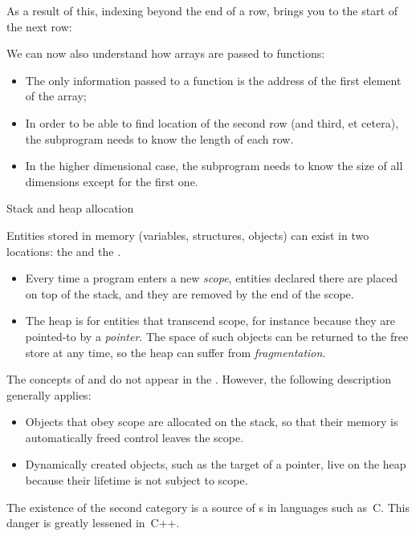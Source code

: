 As a result of this, indexing beyond the end of a row, brings you to the
start of the next row:
%

We can now also understand how arrays are passed to functions:
\begin{itemize}
\item The only information passed to a function is the address of the
  first element of the array;
\item In order to be able to find location of the second row (and
  third, et cetera), the subprogram needs to know the length of each
  row.
\item In the higher dimensional case, the subprogram needs to know the
  size of all dimensions except for the first one.
\end{itemize}

 {Stack and heap allocation}
\label{sec:stack-heap}

Entities stored in memory (variables, structures, objects) can exist
in two locations: the  and the
.
\begin{itemize}
\item Every time a program enters a new
  \emph{scope}, entities declared there are
  placed on top of the stack, and they are removed by the end of the
  scope.
\item The heap is for entities that transcend scope, for instance
  because they are pointed-to by a
  \emph{pointer}.
  The space of such objects can be returned to the free store at any
  time, so the heap can suffer from
  \emph{fragmentation}.
\end{itemize}

The concepts of  and  do not appear
in the . However, the following
description generally applies:
\begin{itemize}
\item Objects that obey scope are allocated on the stack, so that
  their memory is automatically freed control leaves the scope.
\item Dynamically created objects, such as the target of a pointer,
  live on the heap because their lifetime is not subject to scope.
\end{itemize}
The existence of the second category is a source of
s in languages such as~C. This danger is
greatly lessened in~C++.

